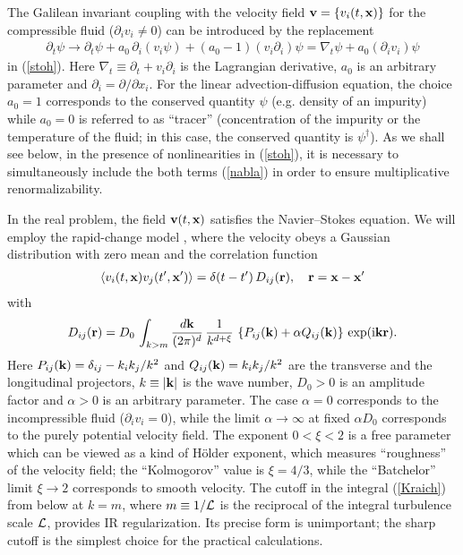 \documentclass[12pt]{iopart}
\def\bfr{{\bf r}}
\def\bfx{{\bf x}}
\begin{document}
The Galilean invariant coupling with the velocity field
${\bf v}= \{ v_{i}(t,\bfx) \}$ for the compressible fluid
($\partial _i v_{i} \ne 0$) can be introduced by the replacement
\begin{eqnarray}
\partial_{t}\psi \to \partial_{t}\psi + a_{0}\, \partial_{i}(v_{i}\psi) +
(a_{0}-1) (v_{i} \partial_{i})\psi =
\nabla_{t} \psi + a_{0}(\partial_{i}v_{i}) \psi
\label{nabla}
\end{eqnarray}
in (\ref{stoh}). Here $\nabla_{t} \equiv \partial_{t} + v_{i} \partial_{i}$
is the Lagrangian derivative, $a_{0}$ is an arbitrary parameter and
$\partial_i = \partial /\partial x_{i}$. For the linear advection-diffusion
equation, the choice $a_{0}=1$ corresponds to the conserved quantity $\psi$
(e.g. density of an impurity) while $a_{0}=0$ is referred to as ``tracer''
(concentration of the impurity or the temperature of the fluid; in this
case, the conserved quantity is $\psi^{\dag}$).
As we shall see below, in the presence of nonlinearities in (\ref{stoh}),
it is necessary to simultaneously include the both terms (\ref{nabla}) in
order to ensure multiplicative renormalizability.


In the real problem, the field ${\bf v}(t,{\bf x})$ satisfies the
Navier--Stokes equation. We will employ the rapid-change model \cite{FGV},
where the velocity obeys a Gaussian distribution with zero mean and
the correlation function
\begin{eqnarray}
\langle v_{i}(t, \bfx) v_{j}(t',{\bf x'})\rangle =  \delta(t-t')\,
D_{ij}(\bfr), \quad \bfr = \bfx-{\bf x'}
\label{white}
\end{eqnarray}
with
\begin{eqnarray}
D_{ij}(\bfr) = D_{0}\, \int_{k>m} \frac{d{\bf k}}{(2\pi)^{d}} \,
\frac{1}{k^{d+\xi}}\, \left\{ P_{ij}({\bf k})+\alpha Q_{ij}({\bf
k}) \right\}\, \exp ({\rm i} {\bf kr} ).
\label{Kraich}
\end{eqnarray}
Here $P_{ij}({\bf k}) = \delta_{ij} - k_i k_j / k^2$ and
$Q_{ij}({\bf k})=k_i k_j/k^2$ are the transverse and the longitudinal
projectors, $k\equiv |{\bf k}|$ is the wave number,
$D_{0}>0$ is an amplitude factor and $\alpha>0$ is an arbitrary
parameter. The case $\alpha=0$ corresponds to the incompressible fluid
($\partial _i v_{i}=0$), while the limit $\alpha \to\infty$ at fixed
$\alpha D_{0}$ corresponds to the purely potential velocity field.
The exponent $0<\xi<2$ is a free parameter which can be viewed as a kind
of H\"{o}lder exponent, which measures ``roughness'' of the velocity field;
the ``Kolmogorov'' value is $\xi=4/3$, while the ``Batchelor'' limit
$\xi\to2$ corresponds to smooth velocity. The cutoff in the
integral (\ref{Kraich}) from below at $k=m$, where $m\equiv 1/{\cal L}$ is
the reciprocal of the integral turbulence scale ${\cal L}$, provides IR
regularization. Its precise form is unimportant; the sharp cutoff is the
simplest choice for the practical calculations.
\end{document}

